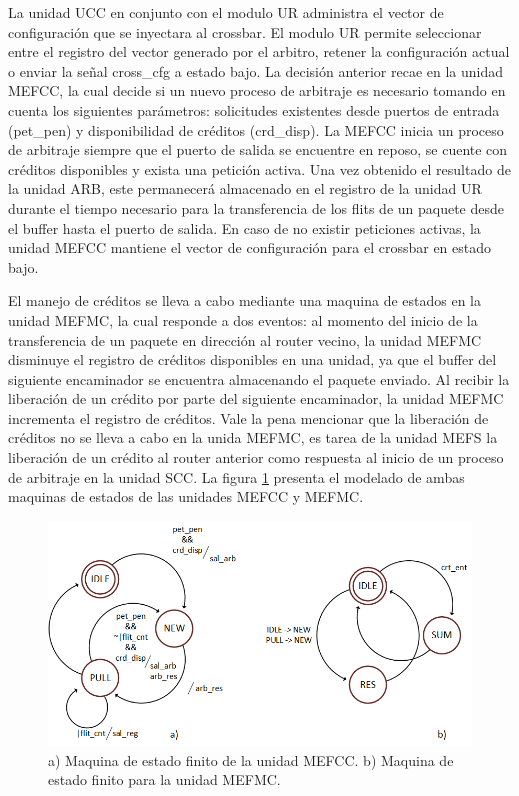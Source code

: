 La unidad UCC en conjunto con el modulo UR administra el vector de configuración que se inyectara al crossbar. El modulo UR permite seleccionar entre el registro del vector generado por el arbitro, retener la configuración actual o enviar la señal cross\_cfg a estado bajo. La decisión anterior recae en la unidad MEFCC, la cual decide si un nuevo proceso de arbitraje es necesario tomando en cuenta los siguientes parámetros: solicitudes existentes desde puertos de entrada (pet\_pen) y disponibilidad de créditos (crd\_disp). La MEFCC inicia un proceso de arbitraje siempre que el puerto de salida se encuentre en reposo, se cuente con créditos disponibles y exista una petición activa. Una vez obtenido el resultado de la unidad ARB, este permanecerá almacenado en el registro de la unidad UR durante el tiempo necesario para la transferencia de los flits de un paquete desde el buffer hasta el puerto de salida. En caso de no existir peticiones activas, la unidad MEFCC mantiene el vector de configuración para el crossbar en estado bajo.

El manejo de créditos se lleva a cabo mediante una maquina de estados en la unidad MEFMC, la cual responde a dos eventos: al momento del inicio de la transferencia de un paquete en dirección al router vecino, la unidad MEFMC disminuye el registro de créditos disponibles en una unidad, ya que el buffer del siguiente encaminador se encuentra almacenando el paquete enviado. Al recibir la liberación de un crédito por parte del siguiente encaminador, la unidad MEFMC incrementa el registro de créditos. Vale la pena mencionar que la liberación de créditos no se lleva  a cabo en la unida MEFMC, es tarea de la unidad MEFS la liberación de un crédito al router anterior como respuesta al inicio de un proceso de arbitraje en la unidad SCC. La figura \ref{fig:ch4_fsm_scc} presenta el modelado de ambas maquinas de estados de las unidades MEFCC y MEFMC.


\begin{figure}
	\begin{center}
		\includegraphics[scale=0.7]{figures/ch4_fsm_scc.png}
	\end{center}
	\caption
		{	
			a) Maquina de estado finito de la unidad MEFCC. b) Maquina de estado finito para la unidad MEFMC.
		}
	\label{fig:ch4_fsm_scc}
\end{figure}









